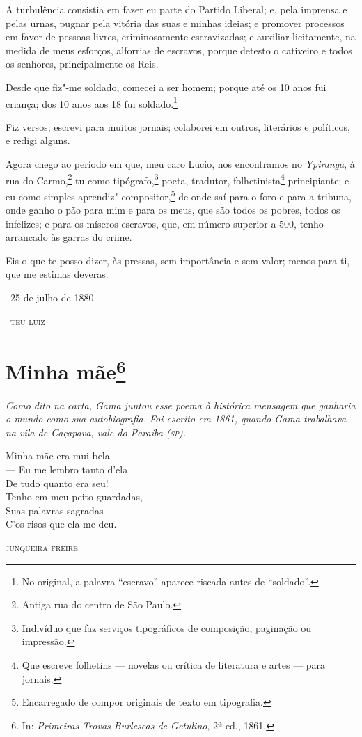 A turbulência consistia em fazer eu parte do Partido Liberal; e, pela
imprensa e pelas urnas, pugnar pela vitória das suas e minhas ideias; e
promover processos em favor de pessoas livres, criminosamente
escravizadas; e auxiliar licitamente, na medida de meus esforços,
alforrias de escravos, porque detesto o cativeiro e todos os senhores,
principalmente os Reis.

Desde que fiz"-me soldado, comecei a ser homem; porque até os 10 anos fui
criança; dos 10 anos aos 18 fui soldado.\footnote{No original, a palavra ``escravo'' aparece riscada antes de ``soldado''.}

Fiz versos; escrevi para muitos jornais; colaborei em outros, literários
e políticos, e redigi alguns.

Agora chego ao período em que, meu caro Lucio, nos encontramos no
\emph{Ypiranga}, à rua do Carmo,\footnote{Antiga rua do centro de São
  Paulo.} tu como tipógrafo,\footnote{Indivíduo que faz serviços
  tipográficos de composição, paginação ou impressão.} poeta, tradutor,
folhetinista\footnote{Que escreve folhetins --- novelas ou crítica de
  literatura e artes --- para jornais.} principiante; e eu como simples
aprendiz"-compositor,\footnote{Encarregado de compor originais de texto
  em tipografia.} de onde
saí para o foro e para a tribuna, onde ganho o pão para mim e para os
meus, que são todos os pobres, todos os infelizes; e para os míseros
escravos, que, em número superior a 500, tenho arrancado às garras do
crime.

Eis o que te posso dizer, às pressas, sem importância e sem valor; menos
para ti, que me estimas deveras.

\bigskip

\hfill\ 25 de julho de 1880\smallskip

\hfill\ \textsc{teu luiz}


\chapter{Minha mãe\footnote[*]{In: \emph{Primeiras Trovas Burlescas de
  Getulino}, 2ª ed., 1861.}}

\begin{flushleft}
{\footnotesize\itshape
Como dito na carta, Gama juntou esse poema à histórica mensagem
que ganharia o mundo como sua autobiografia. Foi escrito em 1861, quando Gama trabalhava na vila de Caçapava, vale do Paraíba (\textsc{sp}).}
\end{flushleft}

{\setlength{\epigraphwidth}{.45\textwidth}
\epigraph{Minha mãe era mui bela\\
--- Eu me lembro tanto d'ela\\
De tudo quanto era seu!\\
Tenho em meu peito guardadas,\\
Suas palavras sagradas\\
C'os risos que ela me deu.}{\textsc{junqueira freire}\footnotemark}}

